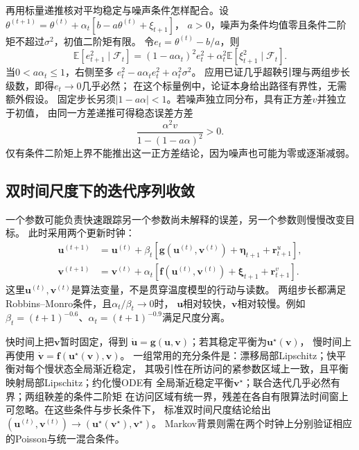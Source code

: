 再用标量递推核对平均稳定与噪声条件怎样配合。设
$\theta^{(t+1)}=\theta^{(t)}+\alpha_t[b-a\theta^{(t)}+\xi_{t+1}]$，
$a>0$，噪声为条件均值零且条件二阶矩不超过$\sigma^2$，初值二阶矩有限。
令$e_t=\theta^{(t)}-b/a$，则
\[
  \mathbb E[e_{t+1}^2\mid\mathcal F_t]
  =(1-a\alpha_t)^2e_t^2+
       \alpha_t^2\mathbb E[\xi_{t+1}^2\mid\mathcal F_t].
\]
当$0<a\alpha_t\leq1$，右侧至多
$e_t^2-a\alpha_te_t^2+\alpha_t^2\sigma^2$。
应用已证几乎超鞅引理与两组步长级数，即得$e_t\to0$几乎必然；
在这个标量例中，论证本身给出路径有界性，无需额外假设。
固定步长另须$|1-a\alpha|<1$。若噪声独立同分布，具有正方差$v$并独立于初值，
由同一方差递推可得稳态误差方差
\[
 \frac{\alpha^2v}{1-(1-a\alpha)^2}>0.
\]
仅有条件二阶矩上界不能推出这一正方差结论，因为噪声也可能为零或逐渐减弱。

\subsection{双时间尺度下的迭代序列收敛}
\label{sec:action-state-two-timescale}

一个参数可能负责快速跟踪另一个参数尚未解释的误差，另一个参数则慢慢改变目标。
此时采用两个更新时钟：
\begin{align*}
  \bm u^{(t+1)}
    &=\bm u^{(t)}+\beta_t[
        \bm g(\bm u^{(t)},\bm v^{(t)})+\bm\eta_{t+1}+\bm r^u_{t+1}],\\
  \bm v^{(t+1)}
    &=\bm v^{(t)}+\alpha_t[
        \bm f(\bm u^{(t)},\bm v^{(t)})+\bm\xi_{t+1}+\bm r^v_{t+1}].
\end{align*}
这里$\bm u^{(t)},\bm v^{(t)}$是算法变量，不是贯穿温度模型的行动与读数。
两组步长都满足Robbins--Monro条件，且$\alpha_t/\beta_t\to0$时，
$\bm u$相对较快，$\bm v$相对较慢。例如
$\beta_t=(t+1)^{-0.6}$、$\alpha_t=(t+1)^{-0.9}$满足尺度分离。

快时间上把$\bm v$暂时固定，得到
$\dot{\bm u}=\bm g(\bm u,\bm v)$；若其稳定平衡为$\bm u^\star(\bm v)$，
慢时间上再使用
$\dot{\bm v}=\bm f(\bm u^\star(\bm v),\bm v)$。
一组常用的充分条件是：漂移局部Lipschitz；快平衡对每个慢状态全局渐近稳定，
其吸引性在所访问的紧参数区域上一致，且平衡映射局部Lipschitz；约化慢ODE有
全局渐近稳定平衡$\bm v^\star$；联合迭代几乎必然有界；两组鞅差的条件二阶矩
在访问区域有统一界，残差在各自有限算法时间窗上可忽略。在这些条件与步长条件下，
标准双时间尺度结论给出
$(\bm u^{(t)},\bm v^{(t)})\to
(\bm u^\star(\bm v^\star),\bm v^\star)$。
Markov背景则需在两个时钟上分别验证相应的Poisson与统一混合条件。

